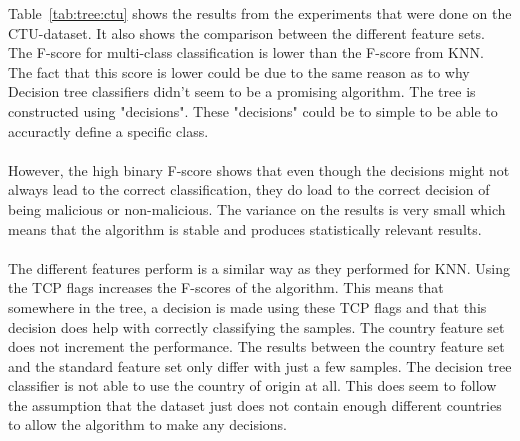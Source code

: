 \noindent Table~\ref{tab:tree:ctu} shows the results from the experiments that were done on the CTU-dataset. It also shows the comparison between the different feature sets. The F-score for multi-class classification is lower than the F-score from KNN. The fact that this score is lower could be due to the same reason as to why Decision tree classifiers didn't seem to be a promising algorithm. The tree is constructed using "decisions". These "decisions" could be to simple to be able to accuractly define a specific class. \\
\\
However, the high binary F-score shows that even though the decisions might not always lead to the correct classification, they do load to the correct decision of being malicious or non-malicious. The variance on the results is very small which means that the algorithm is stable and produces statistically relevant results. \\
\\
The different features perform is a similar way as they performed for KNN. Using the TCP flags increases the F-scores of the algorithm. This means that somewhere in the tree, a decision is made using these TCP flags and that this decision does help with correctly classifying the samples. The country feature set does not increment the performance. The results between the country feature set and the standard feature set only differ with just a few samples. The decision tree classifier is not able to use the country of origin at all. This does seem to follow the assumption that the dataset just does not contain enough different countries to allow the algorithm to make any decisions.

